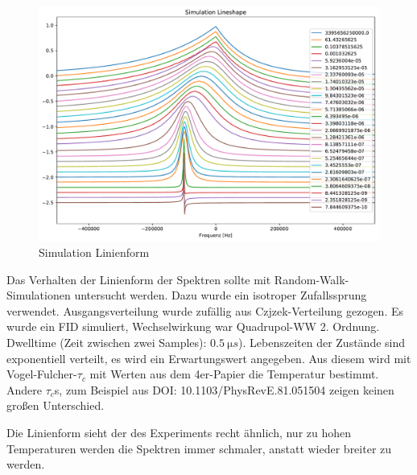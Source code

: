 \begin{figure}
	\begin{center}
		\includegraphics[width=\textwidth]{graphics/plots/SIM/sim_lineshape.pdf}
	\end{center}
	\caption{Simulation Linienform} \label{fig:res:sim_linienform}
\end{figure}
Das Verhalten der Linienform der Spektren sollte mit Random-Walk-Simulationen untersucht werden. Dazu wurde ein isotroper Zufallssprung verwendet. Ausgangsverteilung wurde zufällig aus Czjzek-Verteilung gezogen. Es wurde ein FID simuliert, Wechselwirkung war Quadrupol-WW 2. Ordnung. Dwelltime (Zeit zwischen zwei Samples): $\SI{0.5}{\micro s}$). Lebenszeiten der Zustände sind exponentiell verteilt, es wird ein Erwartungswert angegeben. Aus diesem wird mit Vogel-Fulcher-$\tau_{c}$ mit Werten aus dem 4er-Papier die Temperatur bestimmt. Andere $\tau_c$s, zum Beispiel aus DOI: 10.1103/PhysRevE.81.051504 zeigen keinen großen Unterschied.

Die Linienform sieht der des Experiments recht ähnlich, nur zu hohen Temperaturen werden die Spektren immer schmaler, anstatt wieder breiter zu werden. 

